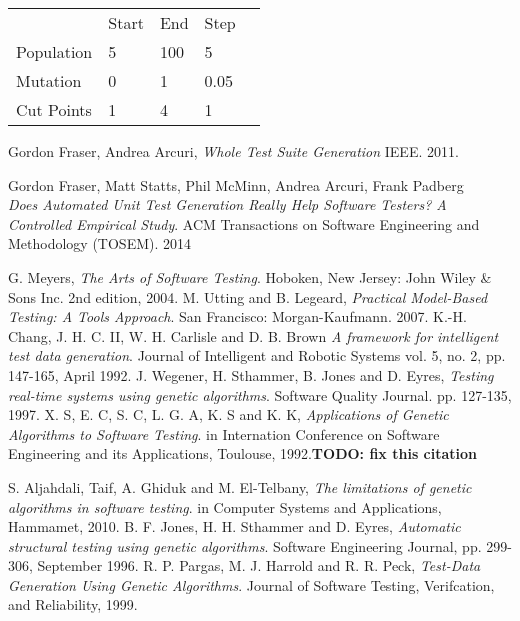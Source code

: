 \documentclass[runningheads]{llncs}
\begin{document}
\begin{table}[h]
\begin{tabular}{l|l|l|l|l}
	\cline{2-4}
	                                 & Start & End & Step &  \\ \cline{1-4}
	\multicolumn{1}{|l|}{Population} & 5     & 100 & 5    &  \\ \cline{1-4}
	\multicolumn{1}{|l|}{Mutation}   & 0     & 1   & 0.05 &  \\ \cline{1-4}
	\multicolumn{1}{|l|}{Cut Points} & 1     & 4   & 1    &  \\ \cline{1-4}
\end{tabular}
\end{table}


\newpage
\begin{thebibliography}{9}

   Gordon Fraser, Andrea Arcuri,
   \emph{Whole Test Suite Generation}
   IEEE.
   2011.

   Gordon Fraser, Matt Statts, Phil McMinn, Andrea Arcuri, Frank Padberg\\
   \emph{Does Automated Unit Test Generation Really Help Software Testers? A Controlled Empirical Study}.
   ACM Transactions on Software Engineering and Methodology (TOSEM).
   2014
   
  G. Meyers,
  \emph{The Arts of Software Testing}.
  Hoboken, New Jersey: John Wiley \& Sons Inc.
  2nd edition,
   2004.
  M. Utting and B. Legeard,
  \emph{Practical Model-Based Testing: A Tools Approach}.
  San Francisco: Morgan-Kaufmann.
   2007.
  	K.-H. Chang, J. H. C. II, W. H. Carlisle and D. B. Brown
  \emph{A framework for intelligent test data generation}.
  Journal of Intelligent and Robotic Systems
  vol. 5, 
  no. 2, 
  pp. 147-165, 
  April 1992.
  	J. Wegener, H. Sthammer, B. Jones and D. Eyres,
  \emph{Testing real-time systems using genetic algorithms}.
  Software Quality Journal.
  pp. 127-135, 
  1997.    
  X. S, E. C, S. C, L. G. A, K. S and K. K,
  \emph{Applications of Genetic Algorithms to Software Testing}.
  in Internation Conference on Software Engineering and its Applications, 
  Toulouse, 
  1992.\textbf{TODO: fix this citation}
  
  	S. Aljahdali, Taif, A. Ghiduk and M. El-Telbany,
  \emph{The limitations of genetic algorithms in software testing}.
  in Computer Systems and Applications, 
  Hammamet, 
  2010. 
  	B. F. Jones, H. H. Sthammer and D. Eyres,
  \emph{Automatic structural testing using genetic algorithms}.
  Software Engineering Journal, 
  pp. 299-306, 
  September 1996.  
  	R. P. Pargas, M. J. Harrold and R. R. Peck,
  \emph{Test-Data Generation Using Genetic Algorithms}.
  Journal of Software Testing, Verifcation, and Reliability, 
  1999.      
\end{thebibliography}
\end{document}
